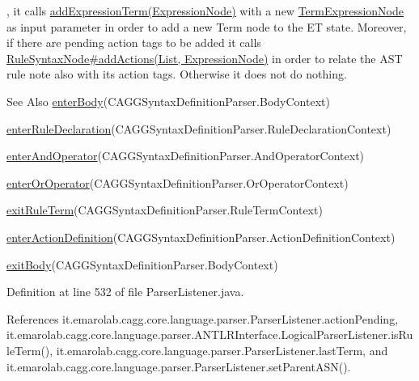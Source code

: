  , it calls \hyperlink{}{add\-Expression\-Term(\-Expression\-Node)} with a new \hyperlink{}{Term\-Expression\-Node} as input parameter in order to add a new Term node to the E\-T state. Moreover, if there are pending action tags to be added it calls \hyperlink{}{Rule\-Syntax\-Node\#add\-Actions(\-List, Expression\-Node)} in order to relate the A\-S\-T rule note also with its action tags. Otherwise it does not do nothing. \begin{DoxySeeAlso}{See Also}
\hyperlink{classit_1_1emarolab_1_1cagg_1_1core_1_1language_1_1parser_1_1ParserListener_a9675dd98156b94a9e26cea3946eaa69d}{enter\-Body}(C\-A\-G\-G\-Syntax\-Definition\-Parser.\-Body\-Context) 

\hyperlink{classit_1_1emarolab_1_1cagg_1_1core_1_1language_1_1parser_1_1ParserListener_a23734ed11648eae22a037a43e8c2d007}{enter\-Rule\-Declaration}(C\-A\-G\-G\-Syntax\-Definition\-Parser.\-Rule\-Declaration\-Context) 

\hyperlink{classit_1_1emarolab_1_1cagg_1_1core_1_1language_1_1parser_1_1ParserListener_a27394515e7347376dc937974202abbc9}{enter\-And\-Operator}(C\-A\-G\-G\-Syntax\-Definition\-Parser.\-And\-Operator\-Context) 

\hyperlink{classit_1_1emarolab_1_1cagg_1_1core_1_1language_1_1parser_1_1ParserListener_a0c20b78d0166b7fe8cf816764d9c7c86}{enter\-Or\-Operator}(C\-A\-G\-G\-Syntax\-Definition\-Parser.\-Or\-Operator\-Context) 

\hyperlink{classit_1_1emarolab_1_1cagg_1_1core_1_1language_1_1parser_1_1ParserListener_a9cddde49b7fd2142b1fcd72b5d6e2c51}{exit\-Rule\-Term}(C\-A\-G\-G\-Syntax\-Definition\-Parser.\-Rule\-Term\-Context) 

\hyperlink{classit_1_1emarolab_1_1cagg_1_1core_1_1language_1_1parser_1_1ParserListener_a95c6463441d582fef5d63aea4eb13f56}{enter\-Action\-Definition}(C\-A\-G\-G\-Syntax\-Definition\-Parser.\-Action\-Definition\-Context) 

\hyperlink{classit_1_1emarolab_1_1cagg_1_1core_1_1language_1_1parser_1_1ParserListener_a4ddc07fbccb866fee058db32839fba42}{exit\-Body}(C\-A\-G\-G\-Syntax\-Definition\-Parser.\-Body\-Context) 
\end{DoxySeeAlso}


Definition at line 532 of file Parser\-Listener.\-java.



References it.\-emarolab.\-cagg.\-core.\-language.\-parser.\-Parser\-Listener.\-action\-Pending, it.\-emarolab.\-cagg.\-core.\-language.\-parser.\-A\-N\-T\-L\-R\-Interface.\-Logical\-Parser\-Listener.\-is\-Rule\-Term(), it.\-emarolab.\-cagg.\-core.\-language.\-parser.\-Parser\-Listener.\-last\-Term, and it.\-emarolab.\-cagg.\-core.\-language.\-parser.\-Parser\-Listener.\-set\-Parent\-A\-S\-N().




